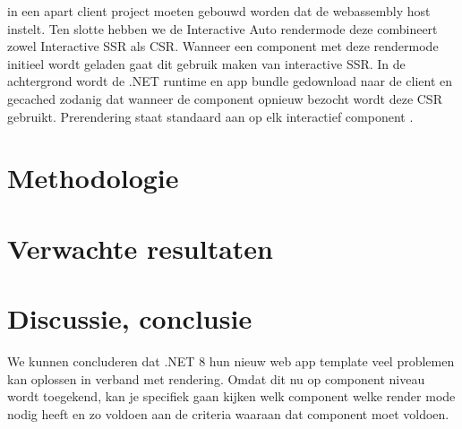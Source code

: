 \documentclass{hogent-article}
\begin{document}
in een apart client project moeten gebouwd worden dat de webassembly host instelt. \autocite{Guardrex2023a} Ten slotte hebben we de Interactive Auto rendermode deze combineert zowel Interactive SSR als CSR. Wanneer een component met deze rendermode
initieel wordt geladen gaat dit gebruik maken van interactive SSR. In de achtergrond wordt de .NET runtime en app bundle gedownload naar de client en gecached zodanig dat wanneer de component opnieuw bezocht wordt deze
CSR gebruikt. \autocite{Guardrex2023a} Prerendering staat standaard aan op elk interactief component \autocite{Guardrex2023a}. 


\section{Methodologie}%
\label{sec:methodologie}



\section{Verwachte resultaten}%
\label{sec:verwachte-resultaten}



\section{Discussie, conclusie}%
\label{sec:discussie-conclusie}
We kunnen concluderen dat .NET 8 hun nieuw web app template veel problemen kan oplossen in
verband met rendering. Omdat dit nu op component niveau wordt toegekend, kan je specifiek
gaan kijken welk component welke render mode nodig heeft en zo voldoen aan
de criteria waaraan dat component moet voldoen.
\end{document}
